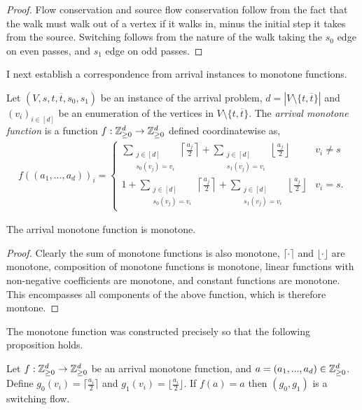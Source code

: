   \begin{proof}
    Flow conservation and source flow conservation follow from the fact that the walk must walk
    out of a vertex if it walks in, minus the initial step it takes from the source. Switching
    follows from the nature of the walk taking the $s_0$ edge on even passes, and $s_1$ edge on odd
    passes.
  \end{proof}
  I next establish a correspondence from arrival instances to monotone functions.
  \begin{definition}
    Let $(V, s, t, \overline{t}, s_0, s_1)$ be an instance of the arrival problem,
    $d = |V \setminus \{t, \overline{t}\}|$ and
    $(v_i)_{i \in [d]}$ be an enumeration of the vertices in 
    $V \setminus \{t, \overline{t}\}$. The \emph{arrival monotone function} is a function
    $f : \mathbb{Z}_{\geq 0}^d \to \mathbb{Z}_{\geq 0}^d$ defined coordinatewise as,
  \begin{align*}
    f((a_1, ..., a_d))_i = \begin{cases}
    \sum_{\substack{j \in [d] \\ s_0(v_j) = v_i}} \left\lceil \frac{a_j}{2} \right\rceil
      + \sum_{\substack{j \in [d] \\ s_1(v_j) = v_i}} \left\lfloor \frac{a_j}{2} \right\rfloor
      & v_i \neq s \\
    1 + \sum_{\substack{j \in [d] \\ s_0(v_j) = v_i}} \left\lceil \frac{a_j}{2} \right\rceil
      + \sum_{\substack{j \in [d] \\ s_1(v_j) = v_i}} \left\lfloor \frac{a_j}{2} \right\rfloor
      & v_i = s.
    \end{cases}
  \end{align*}
  \end{definition}
  \begin{lemma}\label{arrMonotoneIsMonotone}
    The arrival monotone function is monotone.
  \end{lemma}
  \begin{proof}
    Clearly the sum of monotone functions is also monotone, $\lceil \cdot \rceil$ and $\lfloor \cdot \rfloor$
    are monotone, composition of monotone functions is monotone, linear functions with non-negative coefficients
    are monotone, and constant functions are monotone. This encompasses all components of the above function,
    which is therefore montone.
  \end{proof}
  The monotone function was constructed precisely so that the following proposition holds.
  \begin{prop}\label{fixpointIsFlow}
    Let $f : \mathbb{Z}_{\geq 0}^d \to \mathbb{Z}_{\geq 0}^d$ be an arrival monotone function, and $a = (a_1, ..., a_d) \in \mathbb{Z}_{\geq 0}^d$. 
    Define $g_0(v_i) = \lceil \frac{a_i}{2} \rceil$ and $g_1(v_i) = \lfloor \frac{a_i}{2} \rfloor$. 
    If $f(a) = a$ then $(g_0, g_1)$ is a switching flow.
  \end{prop}
